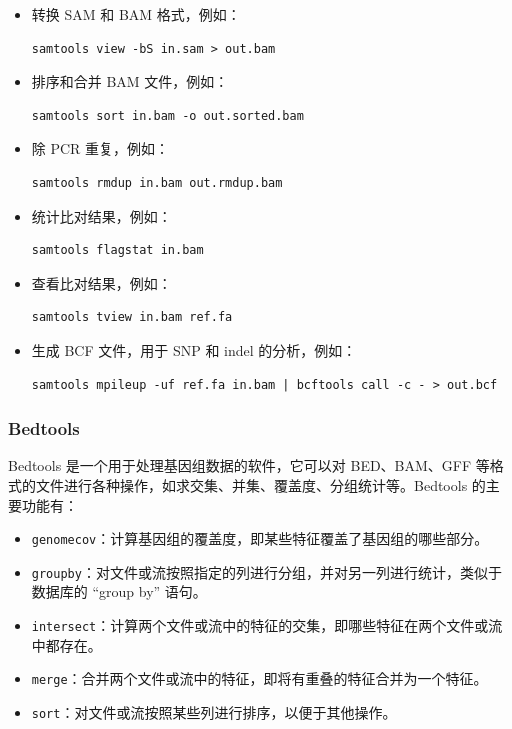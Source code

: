\documentclass[UTF8]{ctexart}
\begin{document}
\begin{itemize}
\item 转换 SAM 和 BAM 格式，例如：
\begin{lstlisting}
samtools view -bS in.sam > out.bam
\end{lstlisting}
\item 排序和合并 BAM 文件，例如：
\begin{lstlisting}
samtools sort in.bam -o out.sorted.bam
\end{lstlisting}
\item 除 PCR 重复，例如：
\begin{lstlisting}
samtools rmdup in.bam out.rmdup.bam
\end{lstlisting}
\item 统计比对结果，例如：
\begin{lstlisting}
samtools flagstat in.bam
\end{lstlisting}
\item 查看比对结果，例如：
\begin{lstlisting}
samtools tview in.bam ref.fa
\end{lstlisting}
\item 生成 BCF 文件，用于 SNP 和 indel 的分析，例如：
\begin{lstlisting}
samtools mpileup -uf ref.fa in.bam | bcftools call -c - > out.bcf
\end{lstlisting}
\end{itemize}

\subsubsection{Bedtools}

Bedtools 是一个用于处理基因组数据的软件，它可以对 BED、BAM、GFF 等格式的文件进行各种操作，如求交集、并集、覆盖度、分组统计等。Bedtools 的主要功能有：

\begin{itemize}
	\item \verb|genomecov|：计算基因组的覆盖度，即某些特征覆盖了基因组的哪些部分。
	\item \verb|groupby|：对文件或流按照指定的列进行分组，并对另一列进行统计，类似于数据库的 “group by” 语句。
	\item \verb|intersect|：计算两个文件或流中的特征的交集，即哪些特征在两个文件或流中都存在。
	\item \verb|merge|：合并两个文件或流中的特征，即将有重叠的特征合并为一个特征。
	\item \verb|sort|：对文件或流按照某些列进行排序，以便于其他操作。
\end{itemize}
\end{document}
